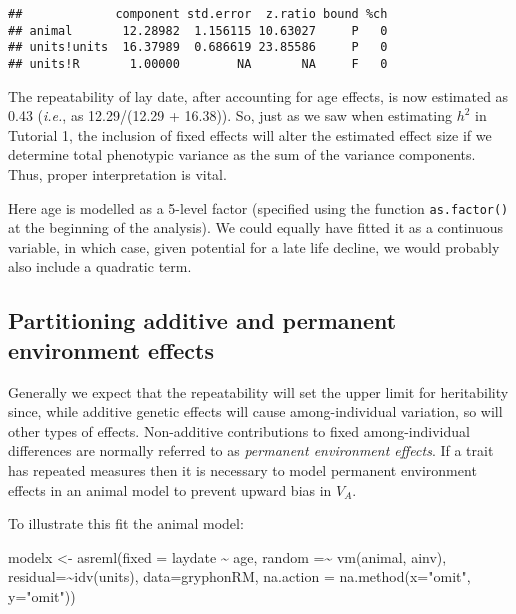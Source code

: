 \documentclass[
  12pt,
]{book}
\newenvironment{Shaded}{\begin{snugshade}}{\end{snugshade}}
\newcommand{\AttributeTok}[1]{\textcolor[rgb]{0.77,0.63,0.00}{#1}}
\newcommand{\FunctionTok}[1]{\textcolor[rgb]{0.00,0.00,0.00}{#1}}
\newcommand{\NormalTok}[1]{#1}
\newcommand{\OtherTok}[1]{\textcolor[rgb]{0.56,0.35,0.01}{#1}}
\newcommand{\SpecialCharTok}[1]{\textcolor[rgb]{0.00,0.00,0.00}{#1}}
\newcommand{\StringTok}[1]{\textcolor[rgb]{0.31,0.60,0.02}{#1}}
\begin{document}
\begin{Shaded}
\end{Shaded}

\begin{verbatim}
##             component std.error  z.ratio bound %ch
## animal       12.28982  1.156115 10.63027     P   0
## units!units  16.37989  0.686619 23.85586     P   0
## units!R       1.00000        NA       NA     F   0
\end{verbatim}

The repeatability of lay date, after accounting for age effects, is now estimated as 0.43 (\emph{i.e.}, as 12.29/(12.29 + 16.38)). So, just as we saw when estimating \(h^2\) in Tutorial 1, the inclusion of fixed effects will alter the estimated effect size if we determine total phenotypic variance as the sum of the variance components. Thus, proper interpretation is vital.

Here age is modelled as a 5-level factor (specified using the function \texttt{as.factor()} at the beginning of the analysis). We could equally have fitted it as a continuous variable, in which case, given potential for a late life decline, we would probably also include a quadratic term.

\hypertarget{partitioning-additive-and-permanent-environment-effects}{%
\subsection{Partitioning additive and permanent environment effects}\label{partitioning-additive-and-permanent-environment-effects}}

Generally we expect that the repeatability will set the upper limit for heritability since, while additive genetic effects will cause among-individual variation, so will other types of effects. Non-additive contributions to fixed among-individual differences are normally referred to as \emph{permanent environment effects}. If a trait has repeated measures then it is necessary to model permanent environment effects in an animal model to prevent upward bias in \(V_A\).

To illustrate this fit the animal model:

\begin{Shaded}
\begin{Highlighting}[]
\NormalTok{modelx }\OtherTok{\textless{}{-}} \FunctionTok{asreml}\NormalTok{(}\AttributeTok{fixed =}\NormalTok{ laydate }\SpecialCharTok{\textasciitilde{}}\NormalTok{ age,}
                 \AttributeTok{random =}\SpecialCharTok{\textasciitilde{}} \FunctionTok{vm}\NormalTok{(animal, ainv),}
                 \AttributeTok{residual=}\SpecialCharTok{\textasciitilde{}}\FunctionTok{idv}\NormalTok{(units),}
                 \AttributeTok{data=}\NormalTok{gryphonRM,}
                 \AttributeTok{na.action =} \FunctionTok{na.method}\NormalTok{(}\AttributeTok{x=}\StringTok{"omit"}\NormalTok{, }\AttributeTok{y=}\StringTok{"omit"}\NormalTok{))}
\end{Highlighting}
\end{Shaded}
\end{document}
